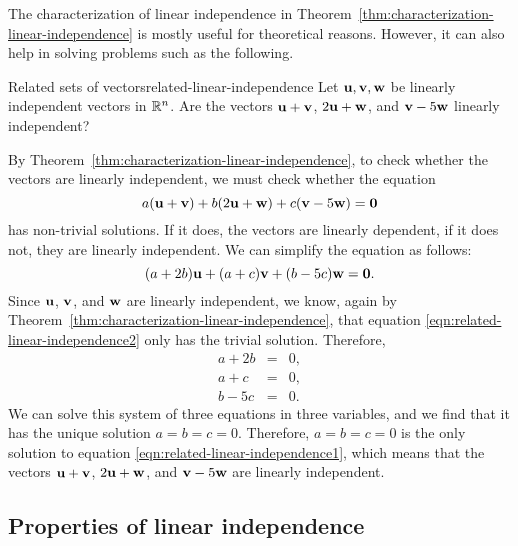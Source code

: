 The characterization of linear independence in
Theorem~\ref{thm:characterization-linear-independence} is mostly
useful for theoretical reasons. However, it can also help in solving
problems such as the following.

\begin{example}{Related sets of vectors}{related-linear-independence}
  Let $\mbox{\bf u},\mbox{\bf v},\mbox{\bf w}$ be linearly independent vectors in
  $\mathbb{R}^n$. Are the vectors $\mbox{\bf u}+\mbox{\bf v}$, $2\mbox{\bf u}+\mbox{\bf w}$,
  and $\mbox{\bf v}-5\mbox{\bf w}$ linearly independent?
\end{example}

\begin{solution}
  By Theorem~\ref{thm:characterization-linear-independence}, to check
  whether the vectors are linearly independent, we must check whether
  the equation
  \begin{equation}\label{eqn:related-linear-independence1}
    a(\mbox{\bf u}+\mbox{\bf v}) + b(2\mbox{\bf u}+\mbox{\bf w}) +
    c(\mbox{\bf v}-5\mbox{\bf w})=\mbox{\bf 0}
  \end{equation}
  has non-trivial solutions.  If it does, the vectors are linearly
  dependent, if it does not, they are linearly independent. We can
  simplify the equation as follows:
  \begin{equation}\label{eqn:related-linear-independence2}
    (a+2b)\mbox{\bf u} + (a+c)\mbox{\bf v} + (b-5c)\mbox{\bf w}=\mbox{\bf 0}.
  \end{equation}
  Since $\mbox{\bf u}$, $\mbox{\bf v}$, and $\mbox{\bf w}$ are linearly
  independent, we know, again by
  Theorem~\ref{thm:characterization-linear-independence}, that
  equation {\eqref{eqn:related-linear-independence2}} only has the
  trivial solution. Therefore,
  \begin{eqnarray*}
    a + 2b & = & 0, \\
    a + c & = & 0, \\
    b - 5c & = & 0. 
  \end{eqnarray*}
  We can solve this system of three equations in three variables, and
  we find that it has the unique solution $a=b=c=0$. Therefore,
  $a=b=c=0$ is the only solution to equation
  {\eqref{eqn:related-linear-independence1}}, which means that the
  vectors $\mbox{\bf u}+\mbox{\bf v}$, $2\mbox{\bf u}+\mbox{\bf w}$, and
  $\mbox{\bf v}-5\mbox{\bf w}$ are linearly independent.
\end{solution}

\subsection{Properties of linear independence}

